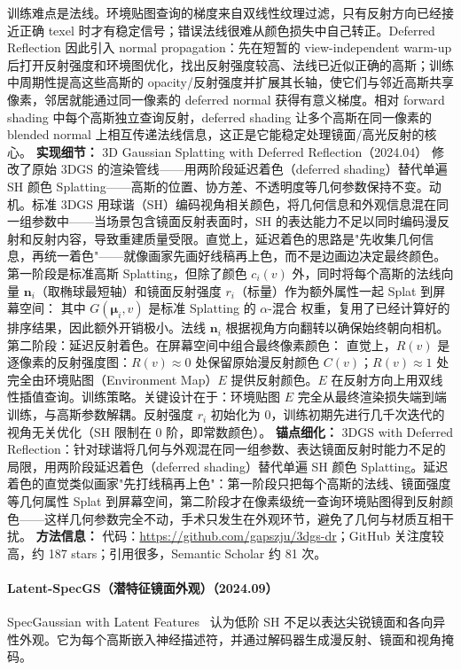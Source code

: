 训练难点是法线。环境贴图查询的梯度来自双线性纹理过滤，只有反射方向已经接近正确 texel 时才有稳定信号；错误法线很难从颜色损失中自己转正。Deferred Reflection 因此引入 normal propagation：先在短暂的 view-independent warm-up 后打开反射强度和环境图优化，找出反射强度较高、法线已近似正确的高斯；训练中周期性提高这些高斯的 opacity/反射强度并扩展其长轴，使它们与邻近高斯共享像素，邻居就能通过同一像素的 deferred normal 获得有意义梯度。相对 forward shading 中每个高斯独立查询反射，deferred shading 让多个高斯在同一像素的 blended normal 上相互传递法线信息，这正是它能稳定处理镜面/高光反射的核心。
\textbf{实现细节：} 3D Gaussian Splatting with Deferred Reflection（2024.04） 修改了原始 3DGS 的渲染管线——用两阶段延迟着色（deferred shading）替代单遍 SH 颜色 Splatting——高斯的位置、协方差、不透明度等几何参数保持不变。动机。标准 3DGS 用球谐（SH）编码视角相关颜色，将几何信息和外观信息混在同一组参数中——当场景包含镜面反射表面时，SH 的表达能力不足以同时编码漫反射和反射内容，导致重建质量受限。直觉上，延迟着色的思路是"先收集几何信息，再统一着色"——就像画家先画好线稿再上色，而不是边画边决定最终颜色。第一阶段是标准高斯 Splatting，但除了颜色 $c_i(v)$ 外，同时将每个高斯的法线向量 $\mathbf{n}_i$（取椭球最短轴）和镜面反射强度 $r_i$（标量）作为额外属性一起 Splat 到屏幕空间： 其中 $G(\boldsymbol{\mu}_i, v)$ 是标准 Splatting 的 $\alpha$-混合 权重，复用了已经计算好的排序结果，因此额外开销极小。法线 $\mathbf{n}_i$ 根据视角方向翻转以确保始终朝向相机。第二阶段：延迟反射着色。在屏幕空间中组合最终像素颜色： 直觉上，$R(v)$ 是逐像素的反射强度图：$R(v) \approx 0$ 处保留原始漫反射颜色 $C(v)$；$R(v) \approx 1$ 处完全由环境贴图（Environment Map）$E$ 提供反射颜色。$E$ 在反射方向上用双线性插值查询。训练策略。关键设计在于：环境贴图 $E$ 完全从最终渲染损失端到端训练，与高斯参数解耦。反射强度 $r_i$ 初始化为 $0$，训练初期先进行几千次迭代的视角无关优化（SH 限制在 0 阶，即常数颜色）。
\textbf{锚点细化：} 3DGS with Deferred Reflection：针对球谐将几何与外观混在同一组参数、表达镜面反射时能力不足的局限，用两阶段延迟着色（deferred shading）替代单遍 SH 颜色 Splatting。延迟着色的直觉类似画家"先打线稿再上色"：第一阶段只把每个高斯的法线、镜面强度等几何属性 Splat 到屏幕空间，第二阶段才在像素级统一查询环境贴图得到反射颜色——这样几何参数完全不动，手术只发生在外观环节，避免了几何与材质互相干扰。
\textbf{方法信息：} 代码：\url{https://github.com/gapszju/3dgs-dr}；GitHub 关注度较高，约 187 stars；引用很多，Semantic Scholar 约 81 次。



\paragraph{Latent-SpecGS（潜特征镜面外观）（2024.09）}
SpecGaussian with Latent Features~\cite{2409_05868} 认为低阶 SH 不足以表达尖锐镜面和各向异性外观。它为每个高斯嵌入神经描述符，并通过解码器生成漫反射、镜面和视角掩码。

